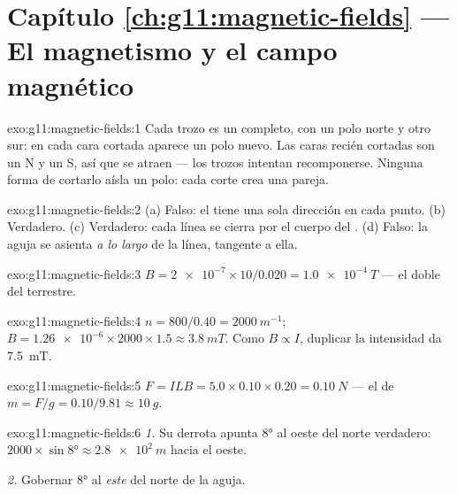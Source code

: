 \section*{Capítulo \ref{ch:g11:magnetic-fields} --- El magnetismo y el campo magnético}

\begin{solution}{exo:g11:magnetic-fields:1}
Cada trozo es un  completo, con un polo norte y otro sur: en cada
cara cortada aparece un polo nuevo. Las caras recién cortadas son un N y
un S, así que se atraen --- los trozos intentan recomponerse. Ninguna
forma de cortarlo aísla un polo: cada corte crea una pareja.
\end{solution}

\begin{solution}{exo:g11:magnetic-fields:2}
(a) Falso: el  tiene una sola dirección en cada punto. (b)
Verdadero. (c) Verdadero: cada línea se cierra por el cuerpo del .
(d) Falso: la aguja se asienta \emph{a lo largo} de la línea, tangente a
ella.
\end{solution}

\begin{solution}{exo:g11:magnetic-fields:3}
$B = \num{2e-7} \times 10 / 0.020 = \qty{1.0e-4}{T}$ --- el doble del
 terrestre.
\end{solution}

\begin{solution}{exo:g11:magnetic-fields:4}
$n = 800/0.40 = \qty{2000}{m^{-1}}$;
$B = \num{1.26e-6} \times 2000 \times 1.5 \approx \qty{3.8}{mT}$. Como
$B \propto I$, duplicar la intensidad da \qty{7.5}{mT}.
\end{solution}

\begin{solution}{exo:g11:magnetic-fields:5}
$F = ILB = 5.0 \times 0.10 \times 0.20 = \qty{0.10}{N}$ --- el  de
$m = F/g = 0.10/9.81 \approx \qty{10}{g}$.
\end{solution}

\begin{solution}{exo:g11:magnetic-fields:6}
\emph{1.} Su derrota apunta $\ang{8}$ al oeste del norte verdadero:
$2000 \times \sin\ang{8} \approx \qty{2.8e2}{m}$ hacia el oeste.

\emph{2.} Gobernar $\ang{8}$ al \emph{este} del norte de la aguja.
\end{solution}


